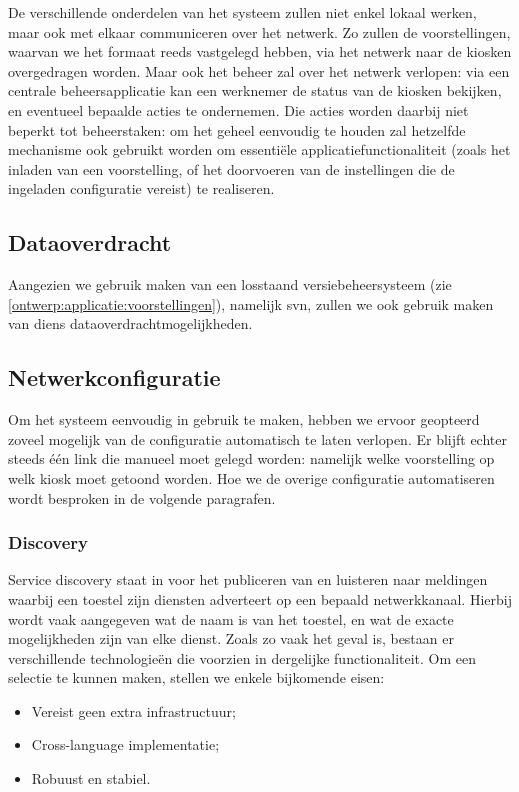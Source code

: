 De verschillende onderdelen van het systeem zullen niet enkel lokaal werken, maar ook met elkaar communiceren over het netwerk. Zo zullen de voorstellingen, waarvan we het formaat reeds vastgelegd hebben, via het netwerk naar de kiosken overgedragen worden. Maar ook het beheer zal over het netwerk verlopen: via een centrale beheersapplicatie kan een werknemer de status van de kiosken bekijken, en eventueel bepaalde acties te ondernemen. Die acties worden daarbij niet beperkt tot beheerstaken: om het geheel eenvoudig te houden zal hetzelfde mechanisme ook gebruikt worden om essentiële applicatiefunctionaliteit (zoals het inladen van een voorstelling, of het doorvoeren van de instellingen die de ingeladen configuratie vereist) te realiseren.

\subsection{Dataoverdracht}

Aangezien we gebruik maken van een losstaand versiebeheersysteem (zie \ref{ontwerp:applicatie:voorstellingen}), namelijk \ac{svn}, zullen we ook gebruik maken van diens dataoverdrachtmogelijkheden.

\subsection{Netwerkconfiguratie}

Om het systeem eenvoudig in gebruik te maken, hebben we ervoor geopteerd zoveel mogelijk van de configuratie automatisch te laten verlopen. Er blijft echter steeds één link die manueel moet gelegd worden: namelijk welke voorstelling op welk kiosk moet getoond worden. Hoe we de overige configuratie automatiseren wordt besproken in de volgende paragrafen.

\subsubsection{Discovery}

Service discovery staat in voor het publiceren van en luisteren naar meldingen waarbij een toestel zijn diensten adverteert op een bepaald netwerkkanaal. Hierbij wordt vaak aangegeven wat de naam is van het toestel, en wat de exacte mogelijkheden zijn van elke dienst.
Zoals zo vaak het geval is, bestaan er verschillende technologieën die voorzien in dergelijke functionaliteit. Om een selectie te kunnen maken, stellen we enkele bijkomende eisen: 
\begin{itemize}
\item Vereist geen extra infrastructuur;
\item Cross-language implementatie;
\item Robuust en stabiel.
\end{itemize}

